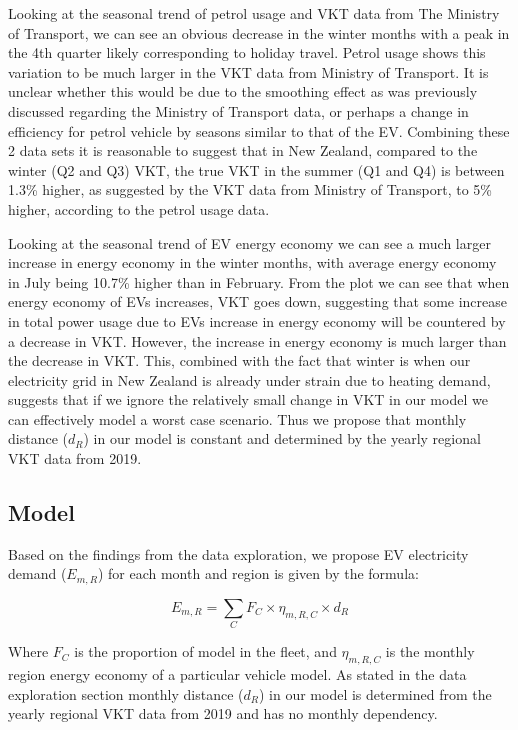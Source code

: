 \documentclass[
]{article}
\begin{document}
Looking at the seasonal trend of petrol usage and VKT data from The
Ministry of Transport, we can see an obvious decrease in the winter
months with a peak in the 4th quarter likely corresponding to holiday
travel. Petrol usage shows this variation to be much larger in the VKT
data from Ministry of Transport. It is unclear whether this would be due
to the smoothing effect as was previously discussed regarding the
Ministry of Transport data, or perhaps a change in efficiency for petrol
vehicle by seasons similar to that of the EV. Combining these 2 data
sets it is reasonable to suggest that in New Zealand, compared to the
winter (Q2 and Q3) VKT, the true VKT in the summer (Q1 and Q4) is
between 1.3\% higher, as suggested by the VKT data from Ministry of
Transport, to 5\% higher, according to the petrol usage data.

Looking at the seasonal trend of EV energy economy we can see a much
larger increase in energy economy in the winter months, with average
energy economy in July being 10.7\% higher than in February. From the
plot we can see that when energy economy of EVs increases, VKT goes
down, suggesting that some increase in total power usage due to EVs
increase in energy economy will be countered by a decrease in VKT.
However, the increase in energy economy is much larger than the decrease
in VKT. This, combined with the fact that winter is when our electricity
grid in New Zealand is already under strain due to heating demand,
suggests that if we ignore the relatively small change in VKT in our
model we can effectively model a worst case scenario. Thus we propose
that monthly distance (\(d_{R}\)) in our model is constant and
determined by the yearly regional VKT data from 2019.

\hypertarget{model}{%
\subsection{Model}\label{model}}

Based on the findings from the data exploration, we propose EV
electricity demand (\(E_{m,R}\)) for each month and region is given by
the formula:

\begin{equation}
\label{eq:energy_usage}
E_{m,R} = \sum_{C} F_C \times \eta_{m,R,C} \times d_{R}
\end{equation}

Where \(F_C\) is the proportion of model in the fleet, and
\(\eta_{m,R,C}\) is the monthly region energy economy of a particular
vehicle model. As stated in the data exploration section monthly
distance (\(d_{R}\)) in our model is determined from the yearly regional
VKT data from 2019 and has no monthly dependency.
\end{document}
